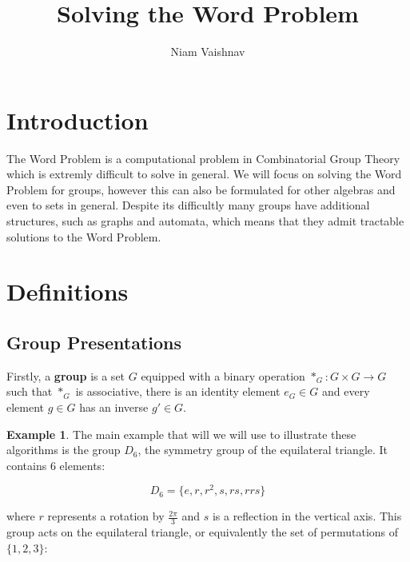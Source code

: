 \documentclass[10pt]{article}
\title{Solving the Word Problem}
\author{Niam Vaishnav}
\date{}
\theoremstyle{plain}
\theoremstyle{definition}
\newtheorem{example}[theorem]{Example}
\theoremstyle{definition}
\theoremstyle{definition}
\begin{document}
\maketitle

\setlength{\columnsep}{1cm}


\begin{multicols}{2}




\setlength{\parskip}{0.5em}
\setlength{\parindent}{0em}


\section{Introduction}

The Word Problem is a computational problem in Combinatorial Group Theory which is extremly difficult to solve in general. We will focus on solving the Word Problem for groups, however this can also be formulated for other algebras and even to sets in general. Despite its difficultly many groups have additional structures, such as graphs and automata, which means that they admit tractable solutions to the Word Problem.


\section{Definitions}

\subsection{Group Presentations}

Firstly, a \textbf{group} is a set $G$ equipped with a binary operation $*_G: G \times G \to G$ such that $*_G$ is associative, there is an identity element $e_G \in G$ and every element $g \in G$ has an inverse $g' \in G$. 

\begin{example}
	The main example that will we will use to illustrate these algorithms is the group $D_6$, the symmetry group of the equilateral triangle. It contains 6 elements:

	$$ D_6 = \{ e, r, r^2, s, rs, rrs \} $$

	where $r$ represents a rotation by $ \frac{2 \pi}{3}$ and $s$ is a reflection in the vertical axis. This group acts on the equilateral triangle, or equivalently the set of permutations of $\{ 1, 2, 3 \}$:


\end{example}
\end{multicols}
\end{document}
